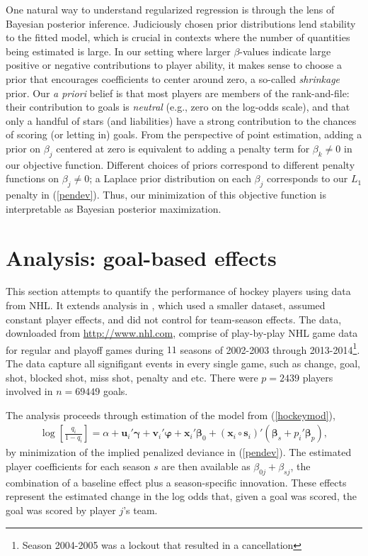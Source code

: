 One natural way to understand regularized regression is through the lens of
Bayesian posterior inference. Judiciously chosen prior distributions lend
stability to the fitted model, which is crucial in contexts where the number
of quantities being estimated is large. In our setting where larger
$\beta$-values indicate large positive or negative contributions to player
ability, it makes sense to choose a prior that encourages coefficients to
center around zero, a so-called {\em shrinkage} prior.  Our {\em a priori}
belief is that most players are members of the rank-and-file: their
contribution to goals is {\em neutral} (e.g., zero on the log-odds scale), and
that only a handful of stars (and liabilities) have a strong contribution to
the chances of scoring (or letting in) goals.  From the perspective of point
estimation, adding a prior on $\beta_j$ centered at zero is equivalent to
adding a penalty term for $\beta_k \ne 0$ in our objective function. Different
choices of priors correspond to different penalty functions on $\beta_j \ne
0$; a Laplace prior distribution on each $\beta_j$  corresponds to our $L_1$
penalty in (\ref{pendev}).  Thus, our minimization of this objective function
is interpretable as Bayesian posterior maximization.

\section{Analysis: goal-based effects}
\label{sec:goals}



This section attempts to quantify the performance of hockey players using data
from NHL. It extends  analysis in \cite{gramacy:jensen:taddy:2013}, which used
a smaller dataset, assumed constant player effects, and did not control for
team-season effects. The data, downloaded from \url{http://www.nhl.com},
comprise of play-by-play NHL game data for regular and playoff games during
$11$ seasons of 2002-2003 through 2013-2014\footnote{Season 2004-2005 was a
lockout that resulted in a cancellation}. The data capture all signifigant
events in every single game, such as change, goal, shot, blocked shot, miss
shot, penalty and etc. There were $p=2439$ players involved in $n=69449$
goals.


The analysis proceeds through estimation of the model from (\ref{hockeymod}),
\begin{align*}
\log\left[\frac{q_{i}}{1-q_{i}}\right] = \alpha + \mathbf{u}_i'\boldsymbol{\gamma} +
\mathbf{v}_i'\boldsymbol{\varphi} + \mathbf{x}_i'\boldsymbol{\beta}_0 +
(\mathbf{x}_i\circ\mathbf{s}_i)'(\boldsymbol{\beta}_s +
p_i'\boldsymbol{\beta}_{p}), \end{align*} by minimization of the implied
penalized deviance in (\ref{pendev}). The estimated player coefficients for
each season $s$ are then available as $\beta_{0j} + \beta_{sj}$,  the
combination of a  baseline effect plus a season-specific innovation.  These
effects represent the estimated change in the log odds that, given a goal was
scored, the goal was scored by player $j$'s team.


